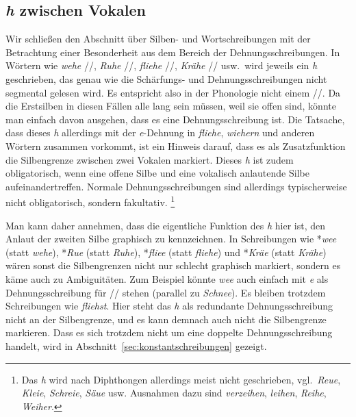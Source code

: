 \subsection{\textit{h} zwischen Vokalen}
\label{sec:hzwischenvokalen}

Wir schließen den Abschnitt über Silben- und Wortschreibungen mit der Betrachtung einer Besonderheit aus dem Bereich der Dehnungsschreibungen.
In Wörtern wie \textit{wehe} //, \textit{Ruhe} //, \textit{fliehe} //, \textit{Krähe} // usw.\ wird jeweils ein \textit{h} geschrieben, das genau wie die Schärfungs- und Dehnungsschreibungen nicht segmental gelesen wird.
Es entspricht also in der Phonologie nicht einem //.
Da die Erstsilben in diesen Fällen alle lang sein müssen, weil sie offen sind, könnte man einfach davon ausgehen, dass es eine Dehnungsschreibung ist.
Die Tatsache, dass dieses \textit{h} allerdings mit der \textit{e}-Dehnung in \textit{fliehe}, \textit{wiehern} und anderen Wörtern zusammen vorkommt, ist ein Hinweis darauf, dass es als Zusatzfunktion die Silbengrenze zwischen zwei Vokalen markiert.
Dieses \textit{h} ist zudem obligatorisch, wenn eine offene Silbe und eine vokalisch anlautende Silbe aufeinandertreffen.
Normale Dehnungsschreibungen sind allerdings typischerweise nicht obligatorisch, sondern fakultativ.%
\footnote{Das \textit{h} wird nach Diphthongen allerdings meist nicht geschrieben, vgl.\ \textit{Reue}, \textit{Kleie}, \textit{Schreie}, \textit{Säue} usw.
Ausnahmen dazu sind \zB \textit{verzeihen}, \textit{leihen}, \textit{Reihe}, \textit{Weiher}.}

Man kann daher annehmen, dass die eigentliche Funktion des \textit{h} hier ist, den Anlaut der zweiten Silbe graphisch zu kennzeichnen.
In Schreibungen wie *\textit{wee} (statt \textit{wehe}), *\textit{Rue} (statt \textit{Ruhe}), *\textit{fliee} (statt \textit{fliehe}) und *\textit{Kräe} (statt \textit{Krähe}) wären sonst die Silbengrenzen nicht nur schlecht graphisch markiert, sondern es käme auch zu Ambiguitäten.
Zum Beispiel könnte \textit{wee} auch einfach mit \textit{e} als Dehnungsschreibung für // stehen (parallel zu \textit{Schnee}).
Es bleiben trotzdem Schreibungen wie \textit{fliehst}.
Hier steht das \textit{h} als redundante Dehnungsschreibung nicht an der Silbengrenze, und es kann demnach auch nicht die Silbengrenze markieren.
Dass es sich trotzdem nicht um eine doppelte Dehnungsschreibung handelt, wird in Abschnitt~\ref{sec:konstantschreibungen} gezeigt.

